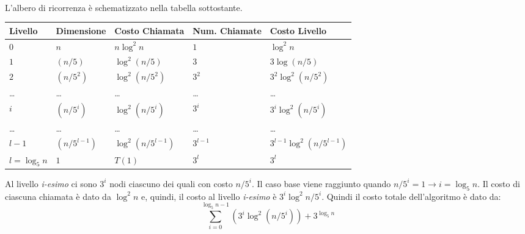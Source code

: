 \documentclass{article}
\begin{document}
\\
L'albero di ricorrenza è schematizzato nella tabella sottostante.
\begin{center}
    \begin{tabular}{| C{1.5cm} | C{1.7cm} | C{2.7cm} | C{1.5cm} | C{3.6cm} |}
        \hline
        Livello & Dimensione &  Costo Chiamata & Num. Chiamate & Costo Livello \\ 
        \hline\hline
        $0$ & $n$ & $n \log^2 n$ & $1$ & $\log^2 n$\\
        \hline
        $1$ & $(n/5)$ & $\log^2 (n/5)$ & $3$ & $3 \log (n/5)$\\[7pt]
        \hline
        $2$ & $(n/5^2)$ & $\log^2 (n/5^2)$ & $3^2$ & $3^2 \log^2 (n/5^2)$\\[7pt]
        \hline
        \dots & \dots & \dots & \dots & \dots \\
        \hline
        $i$ & $(n/5^i)$ & $\log^2 (n/5^i)$ & $3^i$ & $3^i \log^2 (n/5^i)$\\[7pt]
        \hline
        \dots & \dots & \dots & \dots & \dots \\
        \hline
        $l-1$ & $(n/5^{l-1})$ & $\log^2 (n/5^{l-1})$ & $3^{l-1}$ & $3^{l-1}\log^2 (n/5^{l-1})$\\[7pt]
        \hline
        $l = \log_5 n$ & $1$ & $T(1)$ & $3^l$ & $3^l$\\[7pt]
        \hline
    \end{tabular}
\end{center}
Al livello \textit{i-esimo} ci sono $3^i$ nodi ciascuno dei quali con costo $n/5^i$. Il caso base viene raggiunto quando  $n/5^i = 1 \rightarrow i = \log_5 n$.  Il costo di ciascuna chiamata è dato da $\log^2 n$ e, quindi, il costo al livello \textit{i-esimo} è $3^i\log^2 n/5^i$. Quindi il costo totale dell'algoritmo è dato da:
\begin{equation*}
    \sum_{i=0}^{\log_5 n-1} \left(3^i\log^2 (n/5^i)\right) + 3^{\log_5 n}
\end{equation*}
\end{document}

